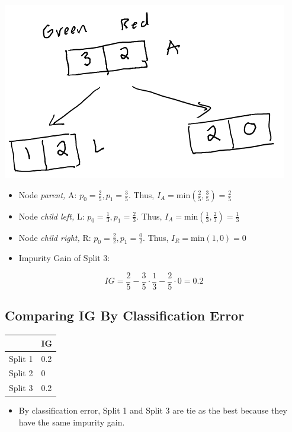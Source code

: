 \documentclass[
]{article}
\providecommand{\tightlist}{%
  \setlength{\itemsep}{0pt}\setlength{\parskip}{0pt}}
\begin{document}
\includegraphics{images/im2.png}

\begin{itemize}
\item
  Node \emph{parent,} A: \(p_0 = \frac{2}{5}, p_1 = \frac{3}{5}\). Thus,
  \(I_{A} = \text{min}(\frac{2}{5}, \frac{3}{5}) = \frac{2}{5}\)
\item
  Node \emph{child left,} L: \(p_0 = \frac{1}{3}, p_1 = \frac{2}{3}\).
  Thus, \(I_{A} = \text{min}(\frac{1}{3}, \frac{2}{3}) = \frac{1}{3}\)
\item
  Node \emph{child right,} R: \(p_0 = \frac{2}{2}, p_1 = \frac{0}{2}\).
  Thus, \(I_{R} = \text{min}(1,0) = 0\)
\item
  Impurity Gain of Split 3:
\end{itemize}

\[IG = \frac{2}{5} - \frac{3}{5} \cdot \frac{1}{3}-\frac{2}{5} \cdot 0 = 0.2\]

\hypertarget{comparing-ig-by-classification-error}{%
\subsection{Comparing IG By Classification
Error}\label{comparing-ig-by-classification-error}}

\begin{longtable}[]{@{}ll@{}}
\toprule
& IG \\
\midrule
\endhead
Split 1 & 0.2 \\
Split 2 & 0 \\
Split 3 & 0.2 \\
\bottomrule
\end{longtable}

\begin{itemize}
\tightlist
\item
  By classification error, Split 1 and Split 3 are tie as the best
  because they have the same impurity gain.
\end{itemize}
\end{document}
